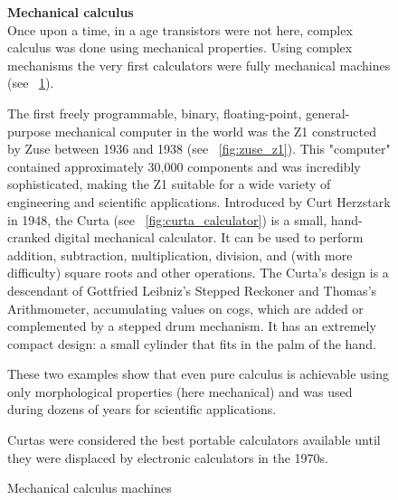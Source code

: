 \begin{figure}[]
    \centering
    \begin{boxedminipage}{0.95\textwidth}
        \textbf{Mechanical calculus}\\
        Once upon a time, in a age transistors were not here, complex calculus was done using mechanical properties.
        Using complex mechanisms the very first calculators were fully mechanical machines (see \figurename~\ref{fig:mechanical_computer}).

        The first freely programmable, binary, floating-point, general-purpose mechanical computer in the world was the Z1 constructed by Zuse between 1936 and 1938 (see \figurename~\ref{fig:zuse_z1}).
        This "computer" contained approximately 30,000 components and was incredibly sophisticated, making the Z1 suitable for a wide variety of engineering and scientific applications.
        Introduced by Curt Herzstark in 1948, the Curta (see \figurename~\ref{fig:curta_calculator}) is a small, hand-cranked digital mechanical calculator.
        It can be used to perform addition, subtraction, multiplication, division, and (with more difficulty) square roots and other operations.
        The Curta's design is a descendant of Gottfried Leibniz's Stepped Reckoner and Thomas's Arithmometer, accumulating values on cogs, which are added or complemented by a stepped drum mechanism.
        It has an extremely compact design: a small cylinder that fits in the palm of the hand.

        These two examples show that even pure calculus is achievable using only morphological properties (here mechanical) and was used during dozens of years for scientific applications.


        Curtas were considered the best portable calculators available until they were displaced by electronic calculators in the 1970s.

        \begin{center}

            \hfil
            \caption{Mechanical calculus machines}
            \label{fig:mechanical_computer}

        \end{center}

    \end{boxedminipage}
\end{figure}



